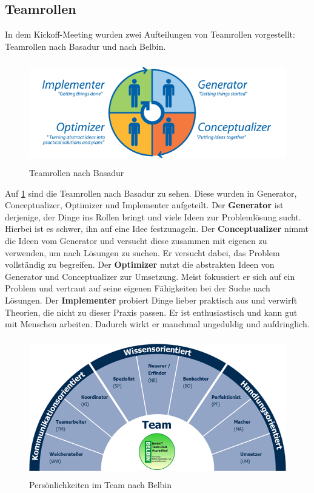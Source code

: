 \documentclass[a4paper,12pt,headsepline]{scrartcl}
\begin{document}
	\subsection{Teamrollen}
		In dem Kickoff-Meeting wurden zwei Aufteilungen von Teamrollen vorgestellt: Teamrollen nach Basadur und nach Belbin.
		\begin{figure} [H]
			\centering
			\includegraphics[height=4.5cm]{Images/Basadur.png}
			\caption{Teamrollen nach Basadur}
			\label{fig:Basadur}
		\end{figure}
		Auf \cref{fig:Basadur} sind die Teamrollen nach Basadur zu sehen. Diese wurden in Generator, Conceptualizer, Optimizer und Implementer aufgeteilt. Der \textbf{Generator} ist derjenige, der Dinge ins Rollen bringt und viele Ideen zur Problemlösung sucht. Hierbei ist es schwer, ihn auf eine Idee festzunageln. Der \textbf{Conceptualizer} nimmt die Ideen vom Generator und versucht diese zusammen mit eigenen zu verwenden, um nach Lösungen zu suchen. Er versucht dabei, das Problem vollständig zu begreifen. Der \textbf{Optimizer} nutzt die abstrakten Ideen von Generator und Conceptualizer zur Umsetzung. Meist fokussiert er sich auf ein Problem und vertraut auf seine eigenen Fähigkeiten bei der Suche nach Lösungen. Der \textbf{Implementer} probiert Dinge lieber praktisch aus und verwirft Theorien, die nicht zu dieser Praxis passen. Er ist enthusiastisch und kann gut mit Menschen arbeiten. Dadurch wirkt er manchmal ungeduldig und aufdringlich.\\
		\begin{figure} [H]
			\centering
			\includegraphics[height=6cm, width=12cm]{Images/Belbin.png}
			\caption{Persönlichkeiten im Team nach Belbin}
			\label{fig:Belbin}
		\end{figure}
\end{document}
